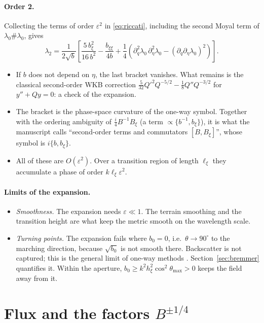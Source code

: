 \documentclass[11pt]{article}
\newcommand{\pd}{\partial}
\begin{document}
\paragraph{Order 2.} Collecting the terms of order $\varepsilon^2$ in
\eqref{eq:riccati}, including the second Moyal term of $\lambda_0\#\lambda_0$,
gives
\begin{equation}\label{eq:lambda2}
\lambda_2=\frac1{2\sqrt b}\left[\frac{5\,b_\xi^2}{16\,b^2}-\frac{b_{\xi\xi}}{4b}
+\frac14\left(\pd_q^2\lambda_0\,\pd_\eta^2\lambda_0-(\pd_q\pd_\eta\lambda_0)^2\right)\right].
\end{equation}
\begin{itemize}
\item If $b$ does not depend on $\eta$, the last bracket vanishes. What remains
  is the classical second-order WKB correction
  $\tfrac5{32}Q'^2Q^{-5/2}-\tfrac18Q''Q^{-3/2}$ for $y''+Qy=0$: a check of the
  expansion.
\item The bracket is the phase-space curvature of the one-way symbol. Together
  with the ordering ambiguity of $\tfrac i4B^{-1}B_\xi$ (a term $\propto
  \{b^{-1},b_\xi\}$), it is what the manuscript calls ``second-order terms and
  commutators $[B,B_\xi]$'', whose symbol is $i\{b,b_\xi\}$.
\item All of these are $O(\varepsilon^2)$. Over a transition region of length
  $\ell_\xi$ they accumulate a phase of order $k\ell_\xi\varepsilon^2$.
\end{itemize}

\paragraph{Limits of the expansion.}
\begin{itemize}
\item \emph{Smoothness.} The expansion needs $\varepsilon\ll1$. The terrain
  smoothing and the transition height are what keep the metric smooth on the
  wavelength scale.
\item \emph{Turning points.} The expansion fails where $b_0=0$, i.e.\
  $\theta\to90^\circ$ to the marching direction, because $\sqrt{b_0}$ is not
  smooth there. Backscatter is not captured; this is the general limit of
  one-way methods \cite{fishman,dehoop}. Section~\ref{sec:bremmer} quantifies it. Within the aperture, $b_0\ge
  k^2h_\xi^2\cos^2\theta_{\max}>0$ keeps the field away from it.
\end{itemize}

\section{Flux and the factors $B^{\pm1/4}$}
\end{document}
